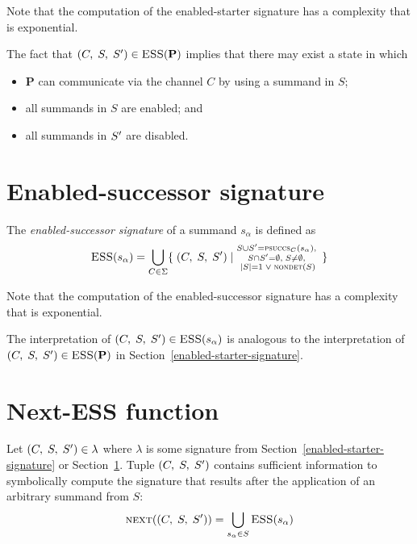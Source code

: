 Note that the computation of the enabled-starter signature has a complexity that is exponential.

\vspace{2mm}

The fact that $(C,\; S,\; {S}^\prime) \in \textsc{ESS}(\mathbf{P})$ implies that there may exist a state in which
\begin{itemize}
\item $\mathbf{P}$ can communicate via the channel $C$ by using a summand in $S$;
\item all summands in $S$ are enabled; and
\item all summands in ${S}^\prime$ are disabled.
\end{itemize}

\section{Enabled-successor signature} \label{enabled-successor-signature}

The \emph{enabled-successor signature} of a summand $s_\alpha$ is defined as
\begin{align*}
\textsc{ESS}(s_\alpha) = \bigcup\limits_{C \in \Sigma} \{\;(C,\; S,\; {S}^\prime)\;|\;\substack{S \cup {S}^\prime = \textsc{psuccs}_{C}(s_\alpha),\;\\ S \cap {S}^\prime = \emptyset,\; S \neq \emptyset,\;\\ |S|=1 \;\lor\; \textsc{nondet}(S)}\;\}
\end{align*}

Note that the computation of the enabled-successor signature has a complexity that is exponential.

\vspace{2mm}

The interpretation of $(C,\; S,\; {S}^\prime) \in \textsc{ESS}(s_\alpha)$ is analogous to the interpretation of $(C,\; S,\; {S}^\prime) \in \textsc{ESS}(\mathbf{P})$ in Section~\ref{enabled-starter-signature}.

\section{Next-ESS function} \label{next-ess-function}

Let $(C,\; S,\; {S}^\prime) \in \lambda$ where $\lambda$ is some signature from Section~\ref{enabled-starter-signature} or Section~\ref{enabled-successor-signature}.
Tuple $(C,\; S,\; {S}^\prime)$ contains sufficient information to symbolically compute the signature that results after the application of an arbitrary summand from $S$:
\begin{align*}
\textsc{next}((C,\; S,\; {S}^\prime)) = \bigcup\limits_{s_\alpha \in S} \textsc{ESS}(s_\alpha)
\end{align*}

